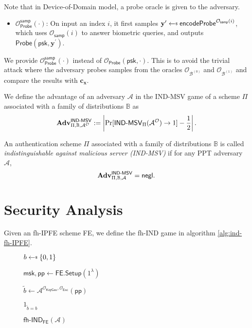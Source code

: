 Note that in Device-of-Domain model, a probe oracle is given to the adversary.

\begin{itemize}

	\item $\mathcal{O}_{\textsf{Probe}}^{\textsf{samp}}(\cdot)$: On input an index $i$, it first samples $\mathbf{y}^\prime \getsdollar \textsf{encodeProbe}^{\mathcal{O}_{\textsf{samp}}(i)}$, which uses $\mathcal{O}_{\textsf{samp}}(i)$ to answer biometric queries, and outputs $\textsf{Probe}(\textsf{psk}, \mathbf{y}^\prime )$. 

\end{itemize}

We provide $\mathcal{O}_{\textsf{Probe}}^{\textsf{samp}}(\cdot)$ instead of $\mathcal{O}_{\textsf{Probe}}(\textsf{psk}, \cdot)$. This is to avoid the trivial attack where the adversary probes samples from the oracles $\mathcal{O}_{\mathcal{B}^{(0)}}$ and $\mathcal{O}_{\mathcal{B}^{(1)}}$ and compare the results with $\mathbf{c_x}$.

We define the advantage of an adversary $\mathcal{A}$ in the \textsf{IND-MSV} game of a scheme $\Pi$ associated with a family of distributions $\mathbb{B}$ as
\[
	\mathbf{Adv}^{\textsf{IND-MSV}}_{\Pi, \mathbb{B}, \mathcal{A}^\mathcal{O}} := \left |\Pr[\textsf{IND-MSV}_{\Pi}(\mathcal{A}^\mathcal{O}) \to 1] - \frac{1}{2} \right|.
\]

An authentication scheme $\Pi$ associated with a family of distributions $\mathbb{B}$ is called \emph{indistinguishable against malicious server (IND-MSV)} if for any PPT adversary $\mathcal{A}$,
\[
	\mathbf{Adv}^{\textsf{IND-MSV}}_{\Pi, \mathbb{B}, \mathcal{A}} = \mathsf{negl}.
\]



\section{Security Analysis}
\label{sec:security_analysis}

Given an fh-IPFE scheme \textsf{FE}, we define the \textsf{fh-IND} game in algorithm \ref{alg:ind-fh-IPFE}.

\begin{figure}[h]
\centering

	\begin{minipage}[t]{0.4\textwidth}
	\begin{algorithm}[H]
	\caption{$\textsf{fh-IND}_{\textsf{FE}}(\mathcal{A})$}
	\label{alg:ind-fh-IPFE}
	\begin{algorithmic}[1]
		\State $b \getsdollar \{0, 1\}$

		\State $\textsf{msk}, \textsf{pp} \gets \textsf{FE.Setup}(1^\lambda)$

		\State $\tilde{b} \gets \mathcal{A}^{\mathcal{O}_{\textsf{KeyGen}}, \mathcal{O}_{\textsf{Enc}}} ( \textsf{pp} )$

		\State \Return $1_{\tilde{b} = b}$
	\end{algorithmic}
	\end{algorithm}
	\end{minipage}

\label{fig:ind-fh-IPFE}
\end{figure}

